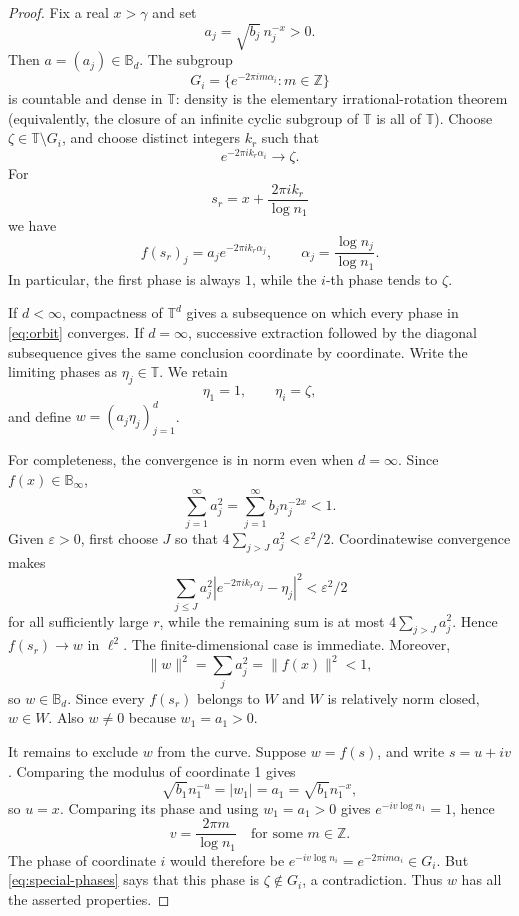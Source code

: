 \documentclass[11pt]{article}
\newcommand{\B}{\mathbb B}
\newcommand{\T}{\mathbb T}
\begin{document}
\begin{proof}
Fix a real $x>\gamma$ and set
\[
 a_j=\sqrt{b_j}\,n_j^{-x}>0.
\]
Then $a=(a_j)\in\B_d$.  The subgroup
\[
 G_i=\{e^{-2\pi i m\alpha_i}:m\in\mathbb Z\}
\]
is countable and dense in $\T$: density is the elementary irrational-rotation
theorem (equivalently, the closure of an infinite cyclic subgroup of $\T$ is
all of $\T$).  Choose $\zeta\in\T\setminus G_i$, and choose distinct integers
$k_r$ such that
\begin{equation}\label{eq:zeta}
 e^{-2\pi i k_r\alpha_i}\longrightarrow\zeta.
\end{equation}
For
\[
 s_r=x+\frac{2\pi i k_r}{\log n_1}
\]
we have
\begin{equation}\label{eq:orbit}
 f(s_r)_j=a_j e^{-2\pi i k_r\alpha_j},
 \qquad \alpha_j=\frac{\log n_j}{\log n_1}.
\end{equation}
In particular, the first phase is always $1$, while the $i$-th phase tends to
$\zeta$.

If $d<\infty$, compactness of $\T^d$ gives a subsequence on which every phase
in \eqref{eq:orbit} converges.  If $d=\infty$, successive extraction followed
by the diagonal subsequence gives the same conclusion coordinate by
coordinate.  Write the limiting phases as $\eta_j\in\T$.  We retain
\begin{equation}\label{eq:special-phases}
 \eta_1=1,\qquad \eta_i=\zeta,
\end{equation}
and define $w=(a_j\eta_j)_{j=1}^d$.

For completeness, the convergence is in norm even when $d=\infty$.  Since
$f(x)\in\B_\infty$,
\[
 \sum_{j=1}^\infty a_j^2
   =\sum_{j=1}^\infty b_j n_j^{-2x}<1.
\]
Given $\varepsilon>0$, first choose $J$ so that
$4\sum_{j>J}a_j^2<\varepsilon^2/2$.  Coordinatewise convergence makes
\[
 \sum_{j\le J}a_j^2
 \left|e^{-2\pi i k_r\alpha_j}-\eta_j\right|^2
 <\varepsilon^2/2
\]
for all sufficiently large $r$, while the remaining sum is at most
$4\sum_{j>J}a_j^2$.  Hence $f(s_r)\to w$ in $\ell^2$.  The finite-dimensional
case is immediate.  Moreover,
\[
 \|w\|^2=\sum_j a_j^2=\|f(x)\|^2<1,
\]
so $w\in\B_d$.  Since every $f(s_r)$ belongs to $W$ and $W$ is relatively
norm closed, $w\in W$.  Also $w\ne0$ because $w_1=a_1>0$.

It remains to exclude $w$ from the curve.  Suppose $w=f(s)$, and write
$s=u+iv$.  Comparing the modulus of coordinate 1 gives
\[
 \sqrt{b_1}n_1^{-u}=|w_1|=a_1=\sqrt{b_1}n_1^{-x},
\]
so $u=x$.  Comparing its phase and using $w_1=a_1>0$ gives
$e^{-iv\log n_1}=1$, hence
\[
 v=\frac{2\pi m}{\log n_1}
 \quad\text{for some }m\in\mathbb Z.
\]
The phase of coordinate $i$ would therefore be
$e^{-iv\log n_i}=e^{-2\pi i m\alpha_i}\in G_i$.  But
\eqref{eq:special-phases} says that this phase is $\zeta\notin G_i$, a
contradiction.  Thus $w$ has all the asserted properties.
\end{proof}
\end{document}
